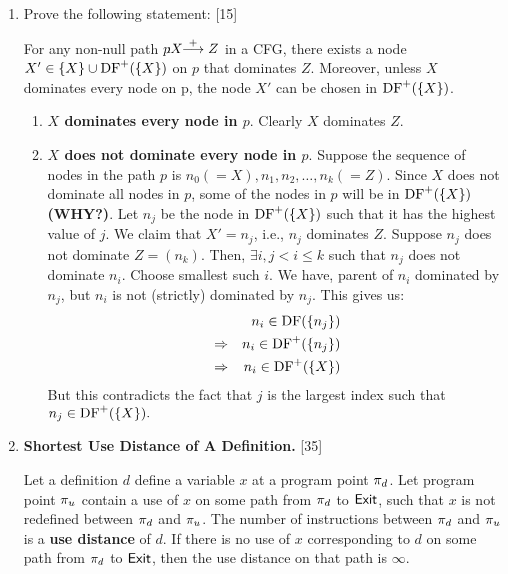\documentclass[12pt]{article}
\newcommand{\answer}[1]{{{\blue #1}}}
\begin{document}
\begin{enumerate}
\item Prove the following statement: \hfill[15\answer{[5+10]}]

  For any non-null path $p\!\!\!:\!\! X\!\!\stackrel{+}{\longrightarrow} Z$ in a CFG, there exists a node \linebreak
  $X' \in \{X\} \cup \mbox{DF}^+(\{X\})$ on $p$ that dominates
  $Z$. Moreover, unless $X$ dominates every node on p, the node
  $X'$ can be chosen in $\mbox{DF}^+(\{X\})$.

\answer{
  \begin{enumerate}
  \item {\bf $X$ dominates every node in $p$}. Clearly $X$
    dominates $Z$.
  \item {\bf $X$ does not dominate every node in $p$}. Suppose the sequence of nodes in the path $p$ is $n_0 (=X), n_1, n_2, \ldots, n_k (=Z)$. Since $X$ does not dominate all nodes in $p$, some of the nodes in $p$ will be in $\mbox{DF}^+(\{X\})$ {\bf (WHY?)}. Let $n_j$ be the node in $\mbox{DF}^+(\{X\})$ such that it has the highest value of $j$. We claim that $X' = n_j$, i.e., $n_j$ dominates $Z$.
  Suppose $n_j$ does not dominate $Z = (n_k)$. Then, $\exists i, j < i \leq k$ such that $n_j$ does not dominate $n_i$. Choose smallest such $i$. We have, parent of $n_i$ dominated by $n_j$, but $n_i$ is not (strictly) dominated by $n_j$. This gives us:
  \begin{eqnarray*}
    &&n_i \in \mbox{DF}(\{n_j\})\\
       &\Rightarrow& n_i \in \mbox{DF}^+(\{n_j\})\\
       &\Rightarrow& n_i \in \mbox{DF}^+(\{X\})
  \end{eqnarray*}
But this contradicts the fact that $j$ is the largest index such that $n_j \in \mbox{DF}^+(\{X\}).$
  \end{enumerate}
}

\clearpage
\item\label{ques1} {\bf Shortest Use Distance of A Definition.}  \hfill[35\answer{[25+8+2]}]

  Let a definition $d$ define a variable $x$ at a program point $\pi_d$.  Let program point $\pi_u$ contain a use of $x$ on some path from $\pi_d$ to ${\sf Exit}$, such that $x$ is not redefined between  $\pi_d$ and  $\pi_u$. The number of instructions between $\pi_d$ and $\pi_u$ is a {\bf use distance} of $d$. If there is no use of $x$ corresponding to $d$ on some path from $\pi_d$ to ${\sf Exit}$, then the use distance on that path is $\infty$.


\end{enumerate}
\end{document}
